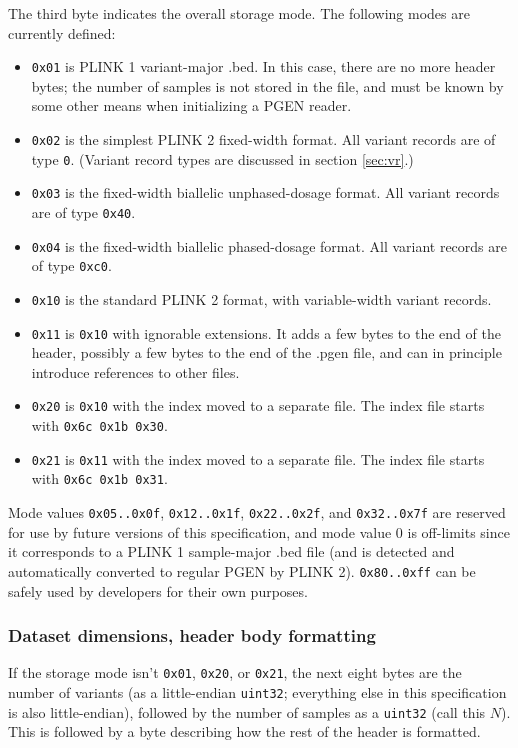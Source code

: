 \documentclass[8pt]{article}
\begin{document}
The third byte indicates the overall storage mode.  The following modes are
currently defined:

\begin{itemize}
  \itemsep0em
\item \texttt{0x01} is PLINK 1 variant-major .bed.  In this case, there are no
  more header bytes; the number of samples is not stored in the file, and must
  be known by some other means when initializing a PGEN reader.
\item \texttt{0x02} is the simplest PLINK 2 fixed-width format.  All variant
  records are of type \texttt{0}.  (Variant record types are discussed in
  section \ref{sec:vr}.)
\item \texttt{0x03} is the fixed-width biallelic unphased-dosage format.  All
  variant records are of type \texttt{0x40}.
\item \texttt{0x04} is the fixed-width biallelic phased-dosage format.  All
  variant records are of type \texttt{0xc0}.
\item \texttt{0x10} is the standard PLINK 2 format, with variable-width variant
  records.
\item \texttt{0x11} is \texttt{0x10} with ignorable extensions.  It adds a few bytes to the end of the header, possibly a few bytes to the end of the .pgen file, and can in principle introduce references to other files.
\item \texttt{0x20} is \texttt{0x10} with the index moved to a separate file.  The index file starts with \texttt{0x6c 0x1b 0x30}.
\item \texttt{0x21} is \texttt{0x11} with the index moved to a separate file.  The index file starts with \texttt{0x6c 0x1b 0x31}.
\end{itemize}

Mode values \texttt{0x05..0x0f}, \texttt{0x12..0x1f}, \texttt{0x22..0x2f}, and
\texttt{0x32..0x7f} are reserved for use by future versions of this
specification, and mode value 0 is off-limits since it corresponds to a PLINK 1
sample-major .bed file (and is detected and automatically converted to regular
PGEN by PLINK 2).
\texttt{0x80..0xff} can be safely used by developers for their own purposes.

\subsubsection{Dataset dimensions, header body formatting}

If the storage mode isn't \texttt{0x01}, \texttt{0x20}, or \texttt{0x21}, the
next eight bytes are the number of variants (as a little-endian
\texttt{uint32}; everything else in this specification is also little-endian),
followed by the number of samples as a \texttt{uint32} (call this $N$).  This
is followed by a byte describing how the rest of the header is formatted.
\end{document}
